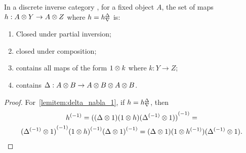 \begin{lemma}\label{lem:delta_nabla_maps_are_closed}
  In a discrete inverse category \X, for a fixed object $A$, the set of maps $h:A\otimes Y\to A\otimes Z$ where
  $h={h}^{\Delta}_{\nabla}$ is:
  \begin{enumerate}[{(}i{)}]
  \item Closed under partial inversion;\label{lemitem:delta_nabla_1}
  \item closed under composition;\label{lemitem:delta_nabla_2}
  \item contains all maps of the form $1\otimes k$ where $k:Y\to Z$;\label{lemitem:delta_nabla_3}
  \item contains $\Delta:A\otimes B \to A\otimes B\otimes A\otimes B$.\label{lemitem:delta_nabla_4}
  \end{enumerate}
\end{lemma}
\begin{proof}
  For~\ref{lemitem:delta_nabla_1}, if $h = {h}^{\Delta}_{\nabla}$, then
  \begin{multline*}
    {h}^{(-1)} = {((\Delta\otimes1)(1\otimes h)({\Delta}^{(-1)}\otimes1))}^{(-1)} =\\
      {({\Delta}^{(-1)}\otimes1)}^{(-1)}{(1\otimes h)}^{(-1)}{(\Delta\otimes1)}^{(-1)} =
        (\Delta\otimes1)(1\otimes{h}^{(-1)})({\Delta}^{(-1)}\otimes1).
  \end{multline*}


\end{proof}
